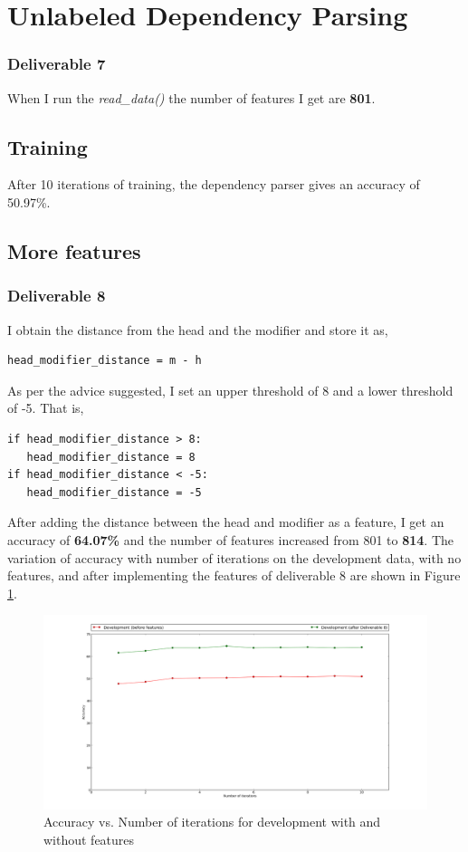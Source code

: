 \documentclass[10pt, letter]{article}
\begin{document}
\section{Unlabeled Dependency Parsing}
\subsubsection*{Deliverable 7}
When I run the \textit{read\_data()} the number of features I get are \textbf{801}.
\subsection{Training}
After 10 iterations of training, the dependency parser gives an accuracy of 50.97\%.
\subsection{More features}
\subsubsection*{Deliverable 8}
I obtain the distance from the head and the modifier and store it as,
\begin{verbatim}
head_modifier_distance = m - h
\end{verbatim}
As per the advice suggested, I set an upper threshold of 8 and a lower threshold of -5. That is,
\begin{verbatim}
if head_modifier_distance > 8:
   head_modifier_distance = 8
if head_modifier_distance < -5:
   head_modifier_distance = -5
\end{verbatim}
After adding the distance between the head and modifier as a feature, I get an accuracy of \textbf{64.07\%} and the number of features increased from 801 to \textbf{814}. The variation of accuracy with number of iterations on the development data, with no features, and after implementing the features of deliverable 8 are shown in Figure \ref{deli8}.
\begin{figure}[h!]
  \centering
    \includegraphics[scale = 0.25]{Images/deliverable8}
    \caption{Accuracy vs. Number of iterations for development with and without features}
  \label{deli8}
\end{figure}
\end{document}
